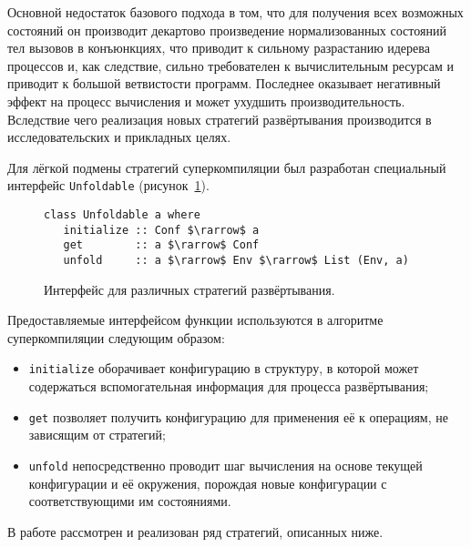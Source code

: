 Основной недостаток базового подхода в том, что для получения всех возможных
состояний он производит декартово произведение нормализованных состояний тел
вызовов в конъюнкциях, что приводит к сильному разрастанию идерева процессов и,
как следствие, сильно требователен к вычислительным ресурсам и приводит
к большой ветвистости программ. Последнее оказывает негативный эффект на процесс
вычисления и может ухудшить производительность.
Вследствие чего реализация новых стратегий развёртывания производится
в исследовательских и прикладных целях.

Для лёгкой подмены стратегий суперкомпиляции был разработан специальный интерфейс \lstinline{Unfoldable}
(рисунок~\ref{fig:unfoldable}).
\begin{figure}[h!]
\begin{lstlisting}
class Unfoldable a where
   initialize :: Conf $\rarrow$ a
   get        :: a $\rarrow$ Conf
   unfold     :: a $\rarrow$ Env $\rarrow$ List (Env, a)
\end{lstlisting}
\caption{Интерфейс для различных стратегий развёртывания.}
\label{fig:unfoldable}
\end{figure}

Предоставляемые интерфейсом функции используются в алгоритме суперкомпиляции следующим образом:
\begin{itemize}
\item \lstinline{initialize} оборачивает конфигурацию в структуру, в которой может содержаться
      вспомогательная информация для процесса развёртывания;
\item \lstinline{get} позволяет получить конфигурацию для применения её к операциям, не зависящим
      от стратегий;
\item \lstinline{unfold} непосредственно проводит шаг вычисления на основе текущей конфигурации
      и её окружения, порождая новые конфигурации с соответствующими им состояниями.
\end{itemize}

В работе рассмотрен и реализован ряд стратегий, описанных ниже.

